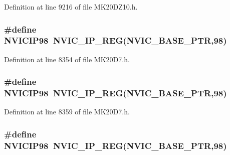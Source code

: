 Definition at line 9216 of file M\+K20\+D\+Z10.\+h.

\subsubsection[{\texorpdfstring{N\+V\+I\+C\+I\+P98}{NVICIP98}}]{\setlength{\rightskip}{0pt plus 5cm}\#define N\+V\+I\+C\+I\+P98~{\bf N\+V\+I\+C\+\_\+\+I\+P\+\_\+\+R\+EG}({\bf N\+V\+I\+C\+\_\+\+B\+A\+S\+E\+\_\+\+P\+TR},98)}\hypertarget{group___n_v_i_c___register___accessor___macros_ga8f193f0210510eacd7656e85bd809cd8}{}\label{group___n_v_i_c___register___accessor___macros_ga8f193f0210510eacd7656e85bd809cd8}


Definition at line 8354 of file M\+K20\+D7.\+h.

\subsubsection[{\texorpdfstring{N\+V\+I\+C\+I\+P98}{NVICIP98}}]{\setlength{\rightskip}{0pt plus 5cm}\#define N\+V\+I\+C\+I\+P98~{\bf N\+V\+I\+C\+\_\+\+I\+P\+\_\+\+R\+EG}({\bf N\+V\+I\+C\+\_\+\+B\+A\+S\+E\+\_\+\+P\+TR},98)}\hypertarget{group___n_v_i_c___register___accessor___macros_ga8f193f0210510eacd7656e85bd809cd8}{}\label{group___n_v_i_c___register___accessor___macros_ga8f193f0210510eacd7656e85bd809cd8}


Definition at line 8359 of file M\+K20\+D7.\+h.

\subsubsection[{\texorpdfstring{N\+V\+I\+C\+I\+P98}{NVICIP98}}]{\setlength{\rightskip}{0pt plus 5cm}\#define N\+V\+I\+C\+I\+P98~{\bf N\+V\+I\+C\+\_\+\+I\+P\+\_\+\+R\+EG}({\bf N\+V\+I\+C\+\_\+\+B\+A\+S\+E\+\_\+\+P\+TR},98)}\hypertarget{group___n_v_i_c___register___accessor___macros_ga8f193f0210510eacd7656e85bd809cd8}{}\label{group___n_v_i_c___register___accessor___macros_ga8f193f0210510eacd7656e85bd809cd8}


